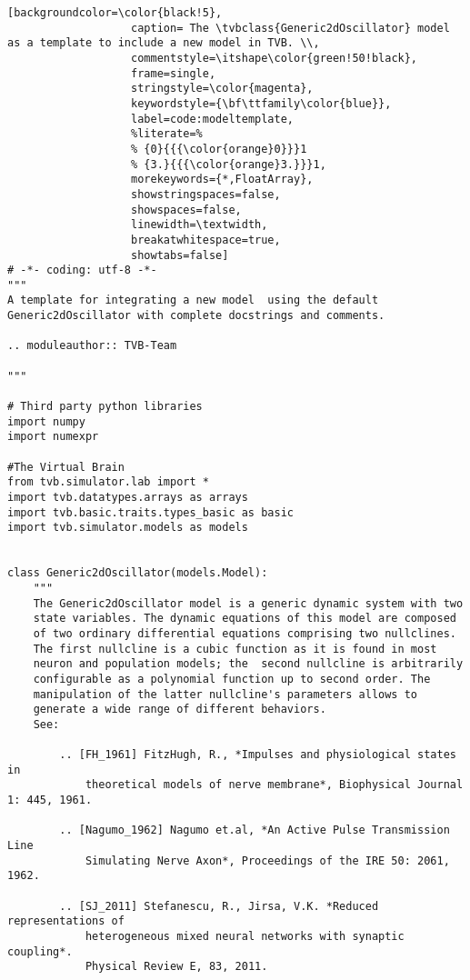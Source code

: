 \documentclass{article}
\newcommand*{\tvbclass}[1]{{\ttfamily\emph{#1}}}    %
\begin{document}
\begin{lstlisting}[backgroundcolor=\color{black!5}, 
                   caption= The \tvbclass{Generic2dOscillator} model as a template to include a new model in TVB. \\,
                   commentstyle=\itshape\color{green!50!black},
                   frame=single,
                   stringstyle=\color{magenta},
                   keywordstyle={\bf\ttfamily\color{blue}},
                   label=code:modeltemplate,
                   %literate=%
                   % {0}{{{\color{orange}0}}}1
                   % {3.}{{{\color{orange}3.}}}1,
                   morekeywords={*,FloatArray},
                   showstringspaces=false,
                   showspaces=false,
                   linewidth=\textwidth,
                   breakatwhitespace=true,
                   showtabs=false]                
# -*- coding: utf-8 -*-
"""
A template for integrating a new model  using the default
Generic2dOscillator with complete docstrings and comments.

.. moduleauthor:: TVB-Team

"""

# Third party python libraries
import numpy
import numexpr

#The Virtual Brain
from tvb.simulator.lab import *
import tvb.datatypes.arrays as arrays
import tvb.basic.traits.types_basic as basic 
import tvb.simulator.models as models


class Generic2dOscillator(models.Model):
    """
    The Generic2dOscillator model is a generic dynamic system with two
    state variables. The dynamic equations of this model are composed
    of two ordinary differential equations comprising two nullclines.
    The first nullcline is a cubic function as it is found in most
    neuron and population models; the  second nullcline is arbitrarily
    configurable as a polynomial function up to second order. The
    manipulation of the latter nullcline's parameters allows to
    generate a wide range of different behaviors.  
    See:
        
        .. [FH_1961] FitzHugh, R., *Impulses and physiological states in 
            theoretical models of nerve membrane*, Biophysical Journal 1: 445, 1961. 
    
        .. [Nagumo_1962] Nagumo et.al, *An Active Pulse Transmission Line 
            Simulating Nerve Axon*, Proceedings of the IRE 50: 2061, 1962.
        
        .. [SJ_2011] Stefanescu, R., Jirsa, V.K. *Reduced representations of 
            heterogeneous mixed neural networks with synaptic coupling*.  
            Physical Review E, 83, 2011. 


\end{lstlisting}
\end{document}
